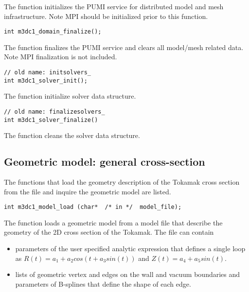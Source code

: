 The function initializes the PUMI service for distributed model and mesh infrastructure. Note MPI should be initialized prior to this function.

\begin{verbatim}
int m3dc1_domain_finalize();
\end{verbatim}\vspace{-.5cm}\hspace{1cm}

The function finalizes the PUMI service and clears all model/mesh related data. Note MPI finalization is not included.

\begin{verbatim}
// old name: initsolvers_
int m3dc1_solver_init(); 
\end{verbatim}\vspace{-.5cm}\hspace{1cm}

The function initialize solver data structure.

\begin{verbatim}
// old name: finalizesolvers_
int m3dc1_solver_finalize()
\end{verbatim}\vspace{-.5cm}\hspace{1cm}

The function cleans the solver data structure. 

\subsection{Geometric model: general cross-section}
The functions that load the geometry description of the Tokamak cross section from the file and inquire the geometric model are listed.

\begin{verbatim}
int m3dc1_model_load (char*  /* in */  model_file);
\end{verbatim}\vspace{-.5cm}\hspace{1cm}

The function loads a geometric model from a model file that describe the geometry of the 2D cross section of the Tokamak. The file can contain
\begin{itemize}
\item parameters of the user specified analytic expression that defines a single loop as $R(t)=a_1 + a_2cos\left(t + a_3sin(t)\right)$ and $Z(t)= a_4 + a_5sin(t)$.
\item lists of geometric vertex and edges on the wall and vacuum boundaries and parameters of B-splines that define the shape of each edge.
\end{itemize}

